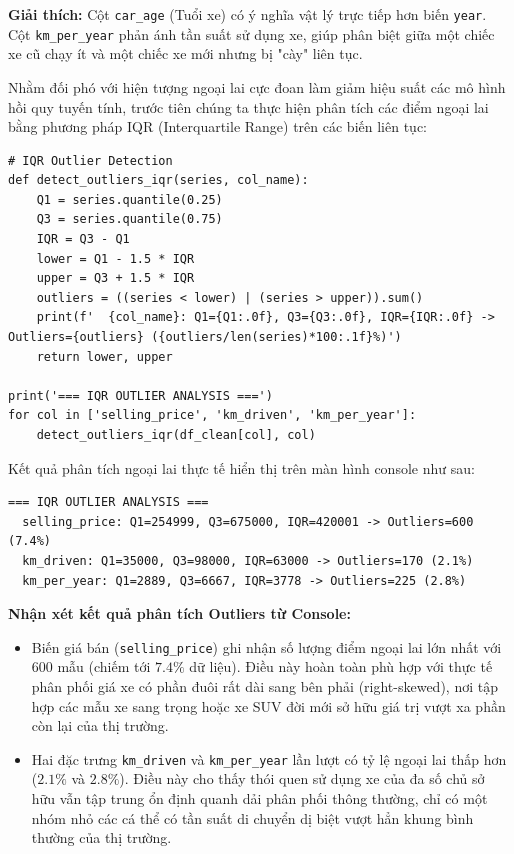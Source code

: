 \textbf{Giải thích:} Cột \texttt{car\_age} (Tuổi xe) có ý nghĩa vật lý trực tiếp hơn biến \texttt{year}. Cột \texttt{km\_per\_year} phản ánh tần suất sử dụng xe, giúp phân biệt giữa một chiếc xe cũ chạy ít và một chiếc xe mới nhưng bị "cày" liên tục.

Nhằm đối phó với hiện tượng ngoại lai cực đoan làm giảm hiệu suất các mô hình hồi quy tuyến tính, trước tiên chúng ta thực hiện phân tích các điểm ngoại lai bằng phương pháp IQR (Interquartile Range) trên các biến liên tục:

\begin{lstlisting}[style=pythoncode, caption={Hàm phát hiện và thống kê Outliers bằng IQR}]
# IQR Outlier Detection
def detect_outliers_iqr(series, col_name):
    Q1 = series.quantile(0.25)
    Q3 = series.quantile(0.75)
    IQR = Q3 - Q1
    lower = Q1 - 1.5 * IQR
    upper = Q3 + 1.5 * IQR
    outliers = ((series < lower) | (series > upper)).sum()
    print(f'  {col_name}: Q1={Q1:.0f}, Q3={Q3:.0f}, IQR={IQR:.0f} -> Outliers={outliers} ({outliers/len(series)*100:.1f}%)')
    return lower, upper

print('=== IQR OUTLIER ANALYSIS ===')
for col in ['selling_price', 'km_driven', 'km_per_year']:
    detect_outliers_iqr(df_clean[col], col)
\end{lstlisting}

Kết quả phân tích ngoại lai thực tế hiển thị trên màn hình console như sau:

\begin{lstlisting}[style=consoleoutput, caption={Kết quả phân tích Outliers bằng thuật toán IQR từ Notebook}]
=== IQR OUTLIER ANALYSIS ===
  selling_price: Q1=254999, Q3=675000, IQR=420001 -> Outliers=600 (7.4%)
  km_driven: Q1=35000, Q3=98000, IQR=63000 -> Outliers=170 (2.1%)
  km_per_year: Q1=2889, Q3=6667, IQR=3778 -> Outliers=225 (2.8%)
\end{lstlisting}

\textbf{Nhận xét kết quả phân tích Outliers từ Console:}
\begin{itemize}
    \item Biến giá bán (\texttt{selling\_price}) ghi nhận số lượng điểm ngoại lai lớn nhất với $600$ mẫu (chiếm tới $7.4\%$ dữ liệu). Điều này hoàn toàn phù hợp với thực tế phân phối giá xe có phần đuôi rất dài sang bên phải (right-skewed), nơi tập hợp các mẫu xe sang trọng hoặc xe SUV đời mới sở hữu giá trị vượt xa phần còn lại của thị trường.
    \item Hai đặc trưng \texttt{km\_driven} và \texttt{km\_per\_year} lần lượt có tỷ lệ ngoại lai thấp hơn ($2.1\%$ và $2.8\%$). Điều này cho thấy thói quen sử dụng xe của đa số chủ sở hữu vẫn tập trung ổn định quanh dải phân phối thông thường, chỉ có một nhóm nhỏ các cá thể có tần suất di chuyển dị biệt vượt hẳn khung bình thường của thị trường.
\end{itemize}

